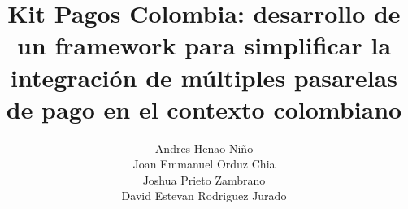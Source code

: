 \documentclass{article}
\title{Kit Pagos Colombia: desarrollo de un framework para simplificar la integración de múltiples pasarelas de pago en el contexto colombiano}
\author{
\begin{tabular}{c}
    Andres Henao Niño \\ 
    Joan Emmanuel Orduz Chia \\
    Joshua Prieto Zambrano \\
    David Estevan Rodriguez Jurado
\end{tabular}
}
\begin{document}
    \renewcommand{\contentsname}{TABLA DE CONTENIDO}
    \renewcommand{\listfigurename}{LISTA DE FIGURAS}
    \renewcommand{\listtablename}{LISTA DE TABLAS}
    \def\tablename{Tabla}
    
    
    
    \newpage
    \thispagestyle{empty}
    \mbox{}
    \newpage
    
    
    
    
    
    
    \tableofcontents
    \newpage
    \listoffigures
    \newpage
    \listoftables

    
    
    
    
    
    
    
    
    
    
    
    
    
\end{document}
